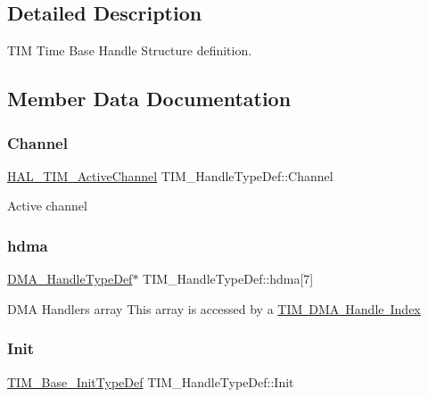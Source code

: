 \subsection{Detailed Description}
T\+IM Time Base Handle Structure definition. 

\subsection{Member Data Documentation}
\mbox{\label{struct_t_i_m___handle_type_def_ae9c5a11c1f5b27c808c0aca453e63870}} 
\subsubsection{\texorpdfstring{Channel}{Channel}}
{\footnotesize\ttfamily \mbox{\hyperlink{group___t_i_m___exported___types_gaa3fa7bcbb4707f1151ccfc90a8cf9706}{H\+A\+L\+\_\+\+T\+I\+M\+\_\+\+Active\+Channel}} T\+I\+M\+\_\+\+Handle\+Type\+Def\+::\+Channel}

Active channel \mbox{\label{struct_t_i_m___handle_type_def_a15338c71de82fa178c685be868e694bd}} 
\subsubsection{\texorpdfstring{hdma}{hdma}}
{\footnotesize\ttfamily \mbox{\hyperlink{group___d_m_a___exported___types_ga41b754a906b86bce54dc79938970138b}{D\+M\+A\+\_\+\+Handle\+Type\+Def}}$\ast$ T\+I\+M\+\_\+\+Handle\+Type\+Def\+::hdma\mbox{[}7\mbox{]}}

D\+MA Handlers array This array is accessed by a \mbox{\hyperlink{group___d_m_a___handle__index}{T\+IM D\+MA Handle Index}} \mbox{\label{struct_t_i_m___handle_type_def_a8b2e61c3c4128e62cb7be7d35048152e}} 
\subsubsection{\texorpdfstring{Init}{Init}}
{\footnotesize\ttfamily \mbox{\hyperlink{struct_t_i_m___base___init_type_def}{T\+I\+M\+\_\+\+Base\+\_\+\+Init\+Type\+Def}} T\+I\+M\+\_\+\+Handle\+Type\+Def\+::\+Init}

